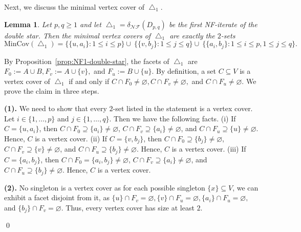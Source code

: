 \documentclass[12pt]{article}
\renewenvironment{proof}{{\noindent\bfseries Proof.}}{\qed}
\theoremstyle{plain}
\newtheorem{lemma}[theorem]{Lemma}
\theoremstyle{definition}
\newcommand{\MIN}{\mathrm{MinCov}}
\begin{document}
		\medskip
		Next, we discuss the minimal vertex cover of \(\bigtriangleup_1\).
		 \begin{lemma}\label{lem:mincov-Delta1}
			Let \(p,q\ge 1\) and let \(\bigtriangleup_1=\delta_{\mathcal{NF}}(D_{p,q})\) be the first NF-iterate of the double star.
			Then the minimal vertex covers of \(\bigtriangleup_1\) are exactly the \(2\)-sets
			\[
			\MIN(\bigtriangleup_1)=
			\bigl\{\{u,a_i\}:1\le i\le p\bigr\} \cup\
			\bigl\{\{v,b_j\}:1\le j\le q\bigr\} \cup\
			\bigl\{\{a_i,b_j\}:1\le i\le p, 1\le j\le q\bigr\}.
			\]
		\end{lemma}
		
		\begin{proof}
			By Proposition~\ref{prop:NF1-double-star}, the facets of \(\bigtriangleup_1\) are $F_0:=A\cup B,  F_v:=A\cup\{v\}, $ and $ F_u:=B\cup\{u\}.$
			By definition, a set \(C\subseteq V\) is a vertex cover of \(\bigtriangleup_1\) if and only if $C\cap F_0\neq\varnothing,C\cap F_v\neq\varnothing, $ and $ C\cap F_u\neq\varnothing.$ 
			We prove the claim in three steps.
			
			\medskip\noindent
			\textbf{(1).} We need to show that every \(2\)-set listed in the statement is a vertex cover. 
			Let \(i\in\{1,\dots,p\}\) and \(j\in\{1,\dots,q\}\). Then we have the following facts. (i)   If \(C=\{u,a_i\}\), then \(C\cap F_0\supseteq\{a_i\}\neq\varnothing\), \(C\cap F_v\supseteq\{a_i\}\neq\varnothing\),
				and \(C\cap F_u\supseteq\{u\}\neq\varnothing\). Hence, \(C\) is a vertex cover. (ii)   If \(C=\{v,b_j\}\), then \(C\cap F_0\supseteq\{b_j\}\neq\varnothing\), \(C\cap F_v\supseteq\{v\}\neq\varnothing\),
				and \(C\cap F_u\supseteq\{b_j\}\neq\varnothing\). Hence, \(C\) is a vertex cover. (iii)   If \(C=\{a_i,b_j\}\), then \(C\cap F_0=\{a_i,b_j\}\neq\varnothing\), \(C\cap F_v\supseteq\{a_i\}\neq\varnothing\),
				and \(C\cap F_u\supseteq\{b_j\}\neq\varnothing\). Hence, \(C\) is a vertex cover. 
			
			\medskip\noindent
			\textbf{(2).} No singleton is a vertex cover as for each possible singleton \(\{x\}\subseteq V\), we can exhibit a facet disjoint from it, as \(
			\{u\}\cap F_v=\varnothing,		\{v\}\cap F_u=\varnothing,		\{a_i\}\cap F_u=\varnothing, \) and \(\{b_j\}\cap F_v=\varnothing.
			\)
			Thus, every vertex cover has size at least \(2\).
			

\end{proof}
\end{document}
